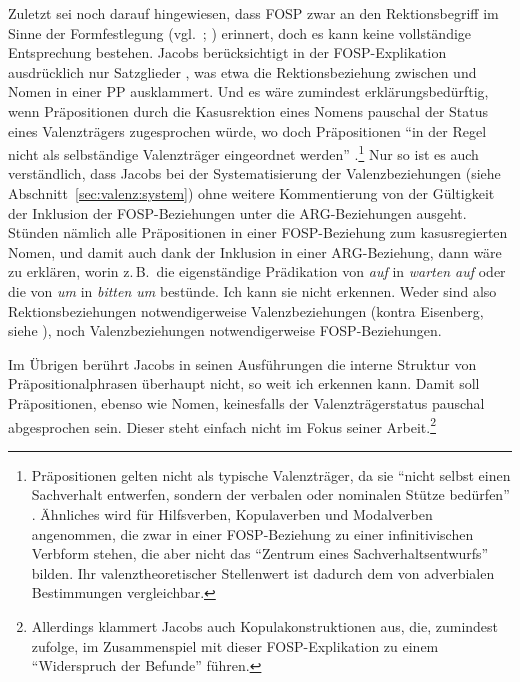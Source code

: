 Zuletzt sei noch darauf hingewiesen, dass FOSP zwar an den Rektionsbegriff im Sinne der Formfestlegung (vgl.\ \citealt[Abschnitt~2.1]{Zifonun:03}; \citealt[33ff]{Eisenberg:06}) erinnert, doch es kann keine vollständige Entsprechung bestehen. Jacobs berücksichtigt in der FOSP-Explikation ausdrücklich nur Satzglieder \citep[14]{Jacobs:94}, was etwa die Rektionsbeziehung zwischen  und Nomen in einer PP ausklammert. Und es wäre zumindest erklärungsbedürftig, wenn Präpositionen durch die Kasusrektion eines Nomens pauschal der Status eines Valenzträgers zugesprochen würde, wo doch Präpositionen "`in der Regel nicht als selbständige Valenzträger eingeordnet werden"' \citep[371]{Zifonun:03}.\footnote{Präpositionen gelten nicht als typische Valenzträger, da sie "`nicht selbst einen Sachverhalt entwerfen, sondern der verbalen oder nominalen Stütze bedürfen"' \citep[374]{Zifonun:03}. Ähnliches wird für Hilfsverben, Kopulaverben und Modalverben angenommen, die zwar in einer FOSP-Beziehung zu einer infinitivischen Verbform stehen, die aber nicht das "`Zentrum eines Sachverhaltsentwurfs"' \citep[375]{Zifonun:03} bilden. Ihr valenztheoretischer Stellenwert ist dadurch dem von adverbialen Bestimmungen vergleichbar.} Nur so ist es auch verständlich, dass Jacobs bei der Systematisierung der Valenzbeziehungen (siehe Abschnitt~\ref{sec:valenz:system}) ohne weitere Kommentierung von der Gültigkeit der Inklusion der FOSP-Beziehungen unter die ARG-Beziehungen ausgeht. Stünden nämlich alle Präpositionen in einer FOSP-Beziehung zum kasusregierten Nomen, und damit auch dank der Inklusion in einer ARG-Beziehung, dann wäre zu erklären, worin z.\,B.\ die eigenständige Prädikation von {\it auf} in {\it warten auf} oder die von {\it um} in {\it bitten um} bestünde. Ich kann sie nicht erkennen. Weder sind also Rektionsbeziehungen notwendigerweise Valenzbeziehungen (kontra Eisenberg, siehe \citealt[360]{Zifonun:03}), noch Valenzbeziehungen notwendigerweise FOSP-Beziehungen. 

Im Übrigen berührt Jacobs in seinen Ausführungen die interne Struktur von Präpositionalphrasen überhaupt nicht, so weit ich erkennen kann. Damit soll Präpositionen, ebenso wie Nomen, keinesfalls der Valenzträgerstatus pauschal abgesprochen sein. Dieser steht einfach nicht im Fokus seiner Arbeit.\footnote{Allerdings klammert Jacobs auch Kopulakonstruktionen aus, die, zumindest \citet[374f]{Zifonun:03} zufolge, im Zusammenspiel mit dieser FOSP-Explikation zu einem "`Widerspruch der Befunde"' führen.}
 

